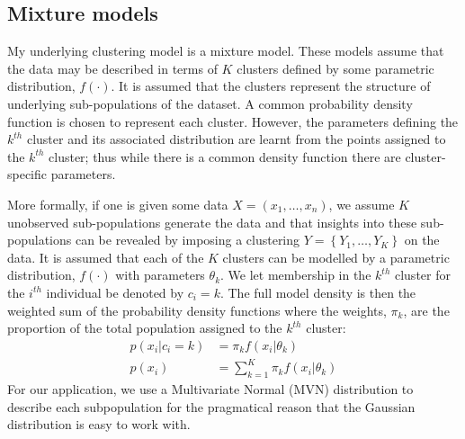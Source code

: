 \documentclass[12pt]{article} %
\begin{document}
	\subsection{Mixture models} \label{sec:theory:sub_sec:mixture_models}
	My underlying clustering model is a mixture model. These models assume that the data may be described in terms of $K$ clusters defined by some parametric distribution, $f(\cdot)$. It is assumed that the clusters represent the structure of underlying sub-populations of the dataset. A common probability density function is chosen to represent each cluster. However, the parameters defining the $k^{th}$ cluster and its associated distribution are learnt from the points assigned to the $k^{th}$ cluster; thus while there is a common density function there are cluster-specific parameters.
	
	More formally, if one is given some data $X = (x_1, \ldots, x_n)$, we assume $K$ unobserved sub-populations generate the data and that insights into these sub-populations can be revealed by imposing a clustering $Y = \left\{Y_1,\ldots,Y_K\right\}$ on the data. It is assumed that each of the $K$ clusters can be modelled by a parametric distribution, $f(\cdot)$ with parameters $\theta_k$. We let membership in the $k^{th}$ cluster for the $i^{th}$ individual be denoted by $c_i = k$. The full model density is then the weighted sum of the probability density functions where the weights, $\pi_k$, are the proportion of the total population assigned to the $k^{th}$ cluster:
	\begin{align}
	p(x_i|c_i = k) &= \pi_k f(x_i | \theta_k) \\
	p(x_i) &= \sum_{k=1}^K \pi_k f(x_i | \theta_k)
	\end{align}
	For our application, we use a Multivariate Normal (MVN) distribution to describe each subpopulation for the pragmatical reason that the Gaussian distribution is easy to work with.
	
\end{document}
